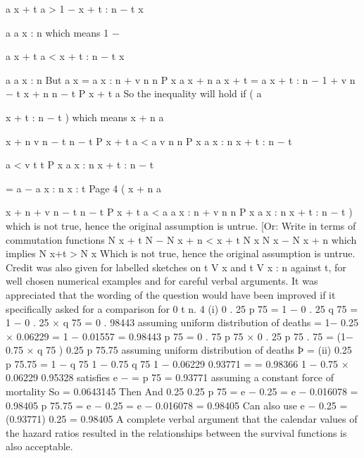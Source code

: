 \documentclass[a4paper,12pt]{article}
\begin{document}
a
 x + t
a
> 1 − x + t : n − t
 x

a
a
x : n
which means
1 −

a
 x + t
a
< x + t : n − t
 x

a
a
x : n
But a  x = a  x : n + v n n P x a  x + n
a  x + t = a  x + t : n − 1 + v n − t
 x + n
n − t P x + t a
So the inequality will hold if
( a

x + t : n − t
)
which means
 x + n a


 x + n
v n − t n − t P x + t a
< a
v n n P x a
x : n
x + t : n − t


a
< v t t P x a
x : n
x + t : n − t


= a
− a
x : n
x : t
Page 4
(
 x + n a


 x + n
+ v n − t n − t P x + t a
< a
a  x : n + v n n P x a
x : n
x + t : n − t
)%
which is not true, hence the original assumption is untrue.
[Or: Write in terms of commutation functions
N x + t
N − N x + n
< x + t
N x
N x − N x + n
which implies
N x+t > N x
Which is not true, hence the original assumption is untrue.
Credit was also given for labelled sketches on t V x and t V x : n against t, for well
chosen numerical examples and for careful verbal arguments.
It was appreciated that the wording of the question would have been improved if it
specifically asked for a comparison for 0 \leq t \leq n.
4
(i)
0 . 25
p 75 = 1 − 0 . 25 q 75 = 1 − 0 . 25 × q 75 = 0 . 98443 assuming uniform distribution
of deaths
= 1− 0.25 × 0.06229 = 1 − 0.01557 = 0.98443
p 75 = 0 . 75 p 75 × 0 . 25 p 75 . 75 = (1− 0.75 × q 75 ) 0.25 p 75.75 assuming uniform
distribution of deaths
Þ
=
(ii)
0.25
p 75.75 =
1 − q 75
1 − 0.75 q 75
1 − 0.06229
0.93771
=
= 0.98366
1 − 0.75 × 0.06229 0.95328
\mu satisfies e − \mu = p 75 = 0.93771 assuming a constant force of mortality
So \mu = 0.0643145
Then
And
0.25
0.25
p 75 = e − 0.25 \mu = e − 0.016078 = 0.98405
p 75.75 = e − 0.25 \mu = e − 0.016078 = 0.98405
Can also use e − 0.25 \mu = (0.93771) 0.25 = 0.98405
A complete verbal argument that the calendar values of the hazard ratios
resulted in the relationships between the survival functions is also
acceptable.
\end{document}
